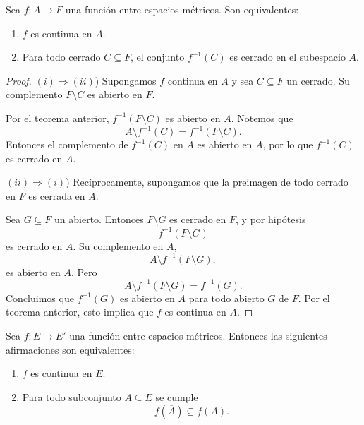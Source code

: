 \begin{teo}
Sea $f : A \to F$ una función entre espacios métricos. Son equivalentes:
\begin{enumerate}[label=(\roman*)]
    \item $f$ es continua en $A$.
    \item Para todo cerrado $C \subseteq F$, el conjunto
    $f^{-1}(C)$ es cerrado en el subespacio $A$.
\end{enumerate}
\end{teo}

\begin{proof}
$(i) \Rightarrow (ii)$) Supongamos $f$ continua en $A$ y sea $C \subseteq F$
un cerrado. Su complemento $F \setminus C$ es abierto en $F$.

Por el teorema anterior, $f^{-1}(F \setminus C)$ es abierto en $A$.
Notemos que
\[
A \setminus f^{-1}(C) = f^{-1}(F \setminus C).
\]
Entonces el complemento de $f^{-1}(C)$ en $A$ es abierto en $A$, por lo que
$f^{-1}(C)$ es cerrado en $A$.

\medskip

$(ii) \Rightarrow (i)$) Recíprocamente, supongamos que la preimagen de
todo cerrado en $F$ es cerrada en $A$.

Sea $G \subseteq F$ un abierto. Entonces $F \setminus G$ es cerrado en $F$,
y por hipótesis
\[
f^{-1}(F \setminus G)
\]
es cerrado en $A$. Su complemento en $A$,
\[
A \setminus f^{-1}(F \setminus G),
\]
es abierto en $A$. Pero
\[
A \setminus f^{-1}(F \setminus G) = f^{-1}(G).
\]
Concluimos que $f^{-1}(G)$ es abierto en $A$ para todo abierto $G$ de $F$.
Por el teorema anterior, esto implica que $f$ es continua en $A$.
\end{proof}

\begin{teo}
Sea $f : E \to E'$ una función entre espacios métricos. Entonces las
siguientes afirmaciones son equivalentes:
\begin{enumerate}[label=(\roman*)]
    \item $f$ es continua en $E$.
    \item Para todo subconjunto $A \subseteq E$ se cumple
    \[
    f(\overline{A}) \subseteq \overline{f(A)}.
    \]
\end{enumerate}
\end{teo}

